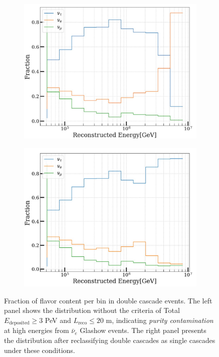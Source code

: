 \begin{figure}[h!]
    \begin{subfigure}[h]{0.7\textwidth}
        \includegraphics{./figures/EventSample/fraction_nomask.pdf}
    \end{subfigure}
    \hfill
    \begin{subfigure}[h]{0.7\textwidth}
        \includegraphics{./figures/EventSample/fraction_withmask.pdf}
       
    \end{subfigure}%
    \caption{Fraction of flavor content per bin in double cascade events. The left panel shows the distribution without the criteria of Total \( E_{\text{deposited}} \geq 3 \) PeV and \( L_{\text{reco}} \leq 20 \) m, indicating \emph{purity contamination} at high energies from \( \bar{\nu}_e \) Glashow events. The right panel presents the distribution after reclassifying double cascades as single cascades under these conditions.}
\end{figure}

